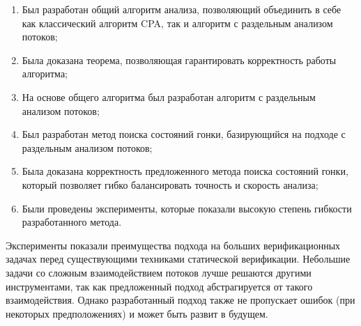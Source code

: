 
\begin{enumerate}
  \item Был разработан общий алгоритм анализа, позволяющий объединить в себе как классический алгоритм CPA, так и алгоритм с раздельным анализом потоков;
  \item Была доказана теорема, позволяющая гарантировать корректность работы алгоритма;
  \item На основе общего алгоритма был разработан алгоритм с раздельным анализом потоков;
  \item Был разработан метод поиска состояний гонки, базирующийся на подходе с раздельным анализом потоков;
  \item Была доказана корректность предложенного метода поиска состояний гонки, который позволяет гибко балансировать точность и скорость анализа;
  \item Были проведены эксперименты, которые показали высокую степень гибкости разработанного метода.
\end{enumerate}

Эксперименты показали преимущества подхода на больших верификационных задачах перед существующими техниками статической верификации.
Небольшие задачи со сложным взаимодействием потоков лучше решаются другими инструментами, так как предложенный подход абстрагируется от такого взаимодействия.
Однако разработанный подход также не пропускает ошибок (при некоторых предположениях) и может быть развит в будущем.

